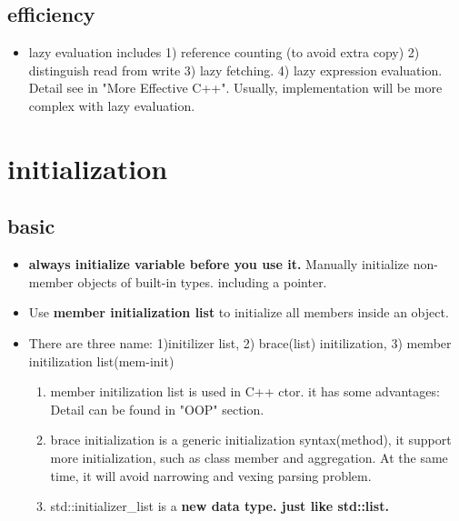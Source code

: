 \documentclass[a4paper,12pt,twoside]{book}
\begin{document}
\subsection{efficiency}
\begin{itemize}
\item  lazy evaluation includes 1) reference counting (to avoid extra copy) 2) distinguish read from write 3) lazy fetching. 4) lazy expression evaluation. Detail see in "More Effective C++". Usually, implementation will be  more complex with lazy evaluation.

\end{itemize}


\section{initialization}

\subsection{basic}
\begin{itemize}
	\item \textbf{always initialize variable before you use it.} Manually initialize non-member objects of built-in types. including a pointer.
	
	\item Use \textbf{member initialization list} to initialize all members inside an object.
		\item There are three name: 1)initilizer list, 2) brace(list) initilization, 3) member initilization list(mem-init)
	\begin{enumerate}
		\item member initilization list is used in C++ ctor. it has some advantages: Detail can be found in "OOP" section. 
		
		\item brace initialization is a generic initialization syntax(method), it support more initialization, such as class member and aggregation. At the same time, it will avoid narrowing and vexing parsing problem. 
		
		\item std::initializer\_list is a \textbf{new data type. just like std::list.}
	\end{enumerate}
\end{itemize}
\end{document}
